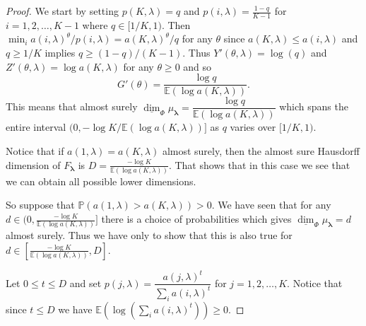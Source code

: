 \documentclass{amsart}
\theoremstyle{plain}
\numberwithin{equation}{section}
\renewcommand{\P}{{\mathbb P}}
\newcommand{\blambda}{{\boldsymbol{\lambda}}}
\newcommand{\ee}{{\mathbb E}}
\newcommand{\udim}{\underline{\dim}}
\begin{document}
\begin{proof}
We start by setting $p(K,\lambda)=q$ and $p(i,\lambda)=\frac{1-q}{K-1}$ for $i=1,2,\ldots ,K-1$ where $q\in [1/K,1)$. 
Then $\min_{i}a(i,\lambda)^\theta/p(i,\lambda)=a(K,\lambda)^\theta/q$ for any $\theta $ since $a(K,\lambda)\leq a(i,\lambda)$ and $q\geq 1/K$ implies $q\geq (1-q)/(K-1)$. 
Thus $Y'(\theta,\lambda)=\log (q)$ and $Z'(\theta,\lambda)=\log a(K,\lambda)$ for any $\theta \geq 0$ and so 
\begin{equation*}
   G'(\theta)=\frac{\log q}{\ee(\log a(K,\lambda))}.
\end{equation*}
This means that almost surely $\udim_{\Phi}\mu_\blambda=\dfrac{\log q}{\ee(\log a(K,\lambda))}$ which spans the entire
interval $(0,-\log K/\ee(\log a(K,\lambda))]$ as $q$ varies over $[1/K,1)$.

Notice that if $a(1,\lambda)=a(K,\lambda)$ almost surely, then the almost sure Hausdorff dimension of $F_\blambda$ is 
$D=\displaystyle\frac{-\log K}{\ee(\log a(K,\lambda))}$. 
That shows that in this case we see that we can obtain all possible lower dimensions.

So suppose that $\P(a(1,\lambda)>a(K,\lambda))>0$. 
We have seen that for any $d\in (0,\displaystyle\frac{-\log K}{\ee(\log a(K,\lambda))}]$ there is a choice
of probabilities which gives $\udim_{\Phi}\mu_\blambda=d$ almost surely. 
Thus we have only to show that this is also true for $d\in \displaystyle[\frac{-\log K}{\ee(\log a(K,\lambda))},D]$.

Let $0\leq t\leq D$ and set $p(j,\lambda)=\dfrac{a(j,\lambda)^t}{\sum_i a(i,\lambda)^t}$ for $j=1,2,\ldots ,K$. 
Notice that since $t\leq D$ we have $\ee(\log (\sum_{i}a(i,\lambda)^{t}))\geq 0$.


\end{proof}
\end{document}
